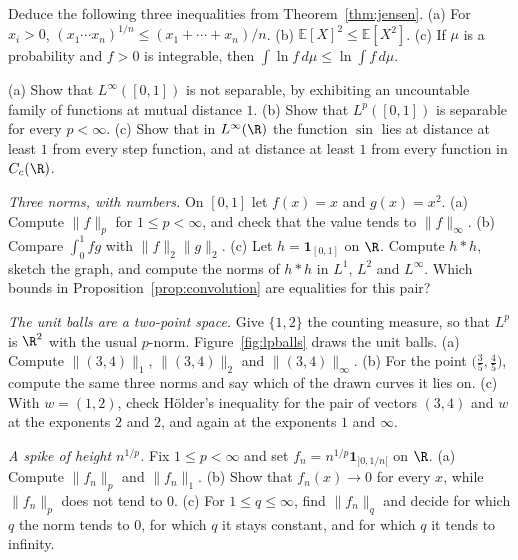 \begin{exercise}[$\star$]\label{ex:jensen}
Deduce the following three inequalities from Theorem~\ref{thm:jensen}. (a) For $x_i>0$, $(x_1\cdots x_n)^{1/n}\le(x_1+\cdots+x_n)/n$. (b) $\mathbb E[X]^2\le\mathbb E[X^2]$. (c) If $\mu$ is a probability and $f>0$ is integrable, then $\int\ln f\,d\mu\le\ln\int f\,d\mu$.
\end{exercise}

\begin{exercise}[$\star\star$]\label{ex:linfinity}
(a) Show that $L^\infty([0,1])$ is not separable, by exhibiting an uncountable family of functions at mutual distance $1$. (b) Show that $L^p([0,1])$ is separable for every $p<\infty$. (c) Show that in $L^\infty(\R)$ the function $\sin$ lies at distance at least $1$ from every step function, and at distance at least $1$ from every function in $C_c(\R)$.
\end{exercise}

\begin{exercise}[$\star$]\label{ex:tent}
\emph{Three norms, with numbers.} On $[0,1]$ let $f(x)=x$ and $g(x)=x^2$. (a) Compute $\|f\|_p$ for $1\le p<\infty$, and check that the value tends to $\|f\|_\infty$. (b) Compare $\int_0^1 fg$ with $\|f\|_2\|g\|_2$. (c) Let $h=\mathbf 1_{[0,1]}$ on $\R$. Compute $h*h$, sketch the graph, and compute the norms of $h*h$ in $L^1$, $L^2$ and $L^\infty$. Which bounds in Proposition~\ref{prop:convolution} are equalities for this pair?
\end{exercise}

\begin{exercise}[$\star$]\label{ex:v7c10a}
\emph{The unit balls are a two-point space.} Give $\{1,2\}$ the counting measure, so that $L^p$ is $\R^2$ with the usual $p$-norm. Figure~\ref{fig:lpballs} draws the unit balls. (a) Compute $\|(3,4)\|_1$, $\|(3,4)\|_2$ and $\|(3,4)\|_\infty$. (b) For the point $\bigl(\frac35,\frac45\bigr)$, compute the same three norms and say which of the drawn curves it lies on. (c) With $w=(1,2)$, check Hölder's inequality for the pair of vectors $(3,4)$ and $w$ at the exponents $2$ and $2$, and again at the exponents $1$ and $\infty$.
\end{exercise}

\begin{exercise}[$\star\star$]\label{ex:v7c10b}
\emph{A spike of height $n^{1/p}$.} Fix $1\le p<\infty$ and set $f_n=n^{1/p}\mathbf 1_{]0,1/n[}$ on $\R$. (a) Compute $\|f_n\|_p$ and $\|f_n\|_1$. (b) Show that $f_n(x)\to0$ for every $x$, while $\|f_n\|_p$ does not tend to $0$. (c) For $1\le q\le\infty$, find $\|f_n\|_q$ and decide for which $q$ the norm tends to $0$, for which $q$ it stays constant, and for which $q$ it tends to infinity.
\end{exercise}

